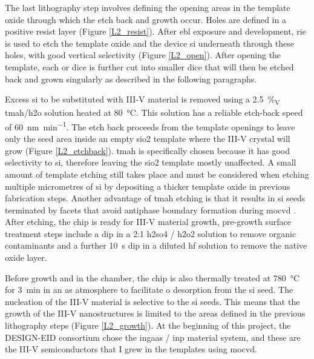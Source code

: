 The last lithography step involves defining the opening areas in the template oxide through which the etch back and growth occur. Holes are defined in a positive resist layer (Figure \ref{L2_resist}). After \acs{ebl} exposure and development, \acs{rie} is used to etch the template oxide and the device \acl{si} underneath through these holes, with good vertical selectivity (Figure \ref{L2_open}). After opening the template, each  or  dice is further cut into smaller  dice that will then be etched back and grown singularly as described in the following paragraphs.
\par
Excess \acl{si} to be substituted with III-V material is removed using a \qty{2.5}{\%_{V\per\V}} \acf{tmah}/\acf{h2o} solution heated at \qty{80}{\degreeCelsius}. This solution has a reliable etch-back speed of \qty{60}{\nm\per\minute}.  The etch back proceeds from the template openings to leave only the seed area inside an empty \acl{sio2} template where the III-V crystal will grow (Figure \ref{L2_etchback}). \Acs{tmah} is specifically chosen because it has good selectivity to \acs{si}, therefore leaving the \acs{sio2} template mostly unaffected. A small amount of template etching still takes place and must be considered when etching multiple micrometres of \acs{si} by depositing a thicker template oxide in previous fabrication steps. Another advantage of \acs{tmah} etching is that it results in \acl{si} seeds terminated by  facets that avoid antiphase boundary formation during \acf{mocvd} \cite{Kunert2018}. After etching, the chip is ready for III-V material growth, pre-growth surface treatment steps include a dip in a 2:1 \acf{h2so4} / \acf{h2o2} solution to remove organic contaminants and a further \qty{10}{s} dip in a diluted \acs{hf} solution to remove the native oxide layer. 
\par
Before growth and in the chamber, the chip is also thermally treated at \qty{780}{\degreeCelsius} for \qty{3}{\minute} in an \acs{as} atmosphere to facilitate \acl{o} desorption from the \acs{si} seed. The nucleation of the III-V material is selective to the \acl{si} seeds. This means that the growth of the III-V nanostructures is limited to the areas defined in the previous lithography steps (Figure \ref{L2_growth}). At the beginning of this project, the DESIGN-EID consortium chose the \acf{ingaas} / \acf{inp} material system, and these are the III-V semiconductors that I grew in the templates using \acs{mocvd}.